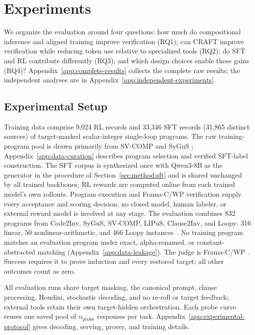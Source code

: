 \section{Experiments}\label{sec:experiments}

We organize the evaluation around four questions: how much do compositional
inference and aligned training improve verification (RQ1); can CRAFT improve verification
while reducing token use relative to specialized tools (RQ2); do SFT and RL
contribute differently (RQ3); and which design choices enable these gains
(RQ4)?  Appendix~\ref{app:complete-results} collects the complete raw results;
the independent analyses are in Appendix~\ref{app:independent-experiments}.

\subsection{Experimental Setup}
\label{sec:exp:setup}

Training data comprise 9,024 RL records and 33,346 SFT records (31,865
distinct sources) of target-masked scalar-integer single-loop programs.
The raw training-program pool is drawn primarily from SV-COMP and SyGuS
\citep{svcomp,alur2013sygus}; Appendix~\ref{app:data-curation} describes
program selection and verified SFT-label construction.  The SFT corpus is
synthesized once with Qwen3-8B as the generator in the procedure of
Section~\ref{sec:method:sft} and is shared unchanged by all trained
backbones; RL rewards are computed online from each trained model's own
rollouts.  Program execution and Frama-C/WP verification supply every
acceptance and scoring decision; no closed model, human labeler, or external
reward model is involved at any stage.  The
evaluation combines 832 programs from Code2Inv, SyGuS, SV-COMP, LIPuS,
Clause2Inv, and Loopy: 316 linear, 50 nonlinear-arithmetic, and 466 Loopy
instances~\citep{si2020code2inv,alur2013sygus,svcomp,yu2023lipus,
cao2025clause2inv,kamath2024leveraging}.  No training program matches an
evaluation program under exact, alpha-renamed, or constant-abstracted matching
(Appendix~\ref{app:data-leakage}). The judge is Frama-C/WP~\citep{framac}.
Success requires it to prove induction and every restored
target; all other outcomes count as zero.

All \sam{} evaluation runs share target masking, the canonical prompt, clause
processing, Houdini, stochastic decoding, and no re-roll or target feedback;
external tools retain their own target-hidden orchestration.  Each probe curve reuses one
saved pool of \(n_{\mathrm{probe}}\) responses per task.  Appendix~\ref{app:experimental-protocol}
gives decoding, serving, prover, and training details.

